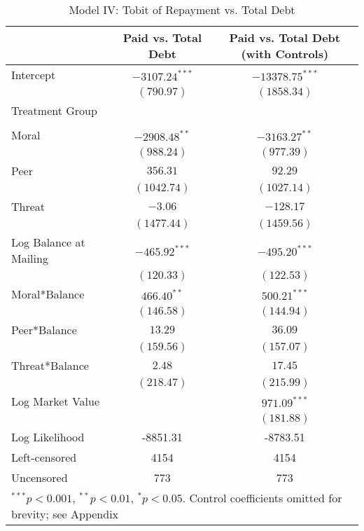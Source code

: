 \documentclass[12pt,titlepage]{article}
\begin{document}
\begin{table}[htbp]
\begin{center}
\begin{tabular}{l c c }
\hline
                       & Paid vs. Total Debt & Paid vs. Total Debt (with Controls) \\
\hline
Intercept              & $-3107.24^{***}$ & $-13378.75^{***}$ \\
                       & $(790.97)$       & $(1858.34)$       \\
Treatment Group        &                  &                   \\
                       &                  &                   \\
\quad Moral            & $-2908.48^{**}$  & $-3163.27^{**}$   \\
                       & $(988.24)$       & $(977.39)$        \\
\quad Peer             & $356.31$         & $92.29$           \\
                       & $(1042.74)$      & $(1027.14)$       \\
\quad Threat           & $-3.06$          & $-128.17$         \\
                       & $(1477.44)$      & $(1459.56)$       \\
Log Balance at Mailing & $-465.92^{***}$  & $-495.20^{***}$   \\
                       & $(120.33)$       & $(122.53)$        \\
Moral*Balance          & $466.40^{**}$    & $500.21^{***}$    \\
                       & $(146.58)$       & $(144.94)$        \\
Peer*Balance           & $13.29$          & $36.09$           \\
                       & $(159.56)$       & $(157.07)$        \\
Threat*Balance         & $2.48$           & $17.45$           \\
                       & $(218.47)$       & $(215.99)$        \\
Log Market Value       &                  & $971.09^{***}$    \\
                       &                  & $(181.88)$        \\
\hline
Log Likelihood         & -8851.31         & -8783.51          \\
Left-censored          & 4154             & 4154              \\
Uncensored             & 773              & 773               \\
\hline
\multicolumn{3}{l}{\scriptsize{$^{***}p<0.001$, $^{**}p<0.01$, $^*p<0.05$. Control coefficients omitted for brevity; see Appendix}}
\end{tabular}
\caption{Model IV: Tobit of Repayment vs. Total Debt}
\label{table:modelIV}
\end{center}
\end{table}
\end{document}
